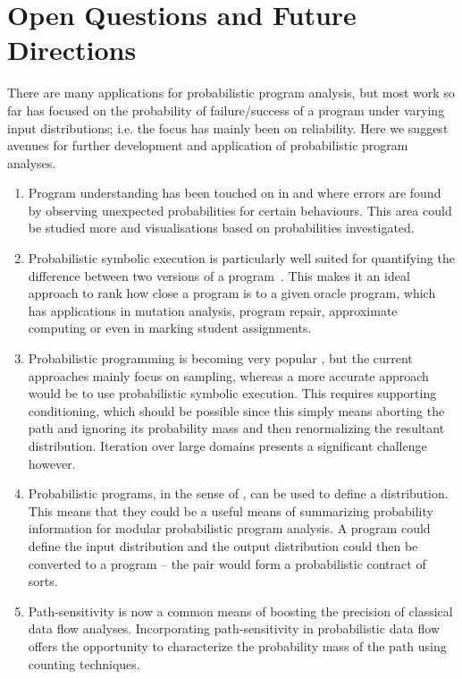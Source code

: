 \section{Open Questions and Future Directions}
\label{sec:future}

There are many applications for probabilistic program analysis, but most work so far has focused on the probability of failure/success of a program under varying input distributions; i.e. the focus has mainly been on reliability.
Here we suggest avenues for further development and application of
probabilistic program analyses.

\begin{enumerate}

\item Program understanding has been touched on in \cite{Geldenhuys2012} and \cite{Filieri2015} where errors are found by observing unexpected probabilities for certain behaviours. This area could be studied more and visualisations based on probabilities investigated.

\item Probabilistic symbolic execution is particularly well suited for quantifying the difference between two versions of a program~\cite{Filieri2015b}. This makes it an ideal approach to rank how close a program is to a given oracle program, which has applications in mutation analysis, program repair, approximate computing or even in marking student assignments.

\item Probabilistic programming is becoming very popular \cite{Gordon2014}, but the current approaches mainly focus on sampling, whereas a more accurate approach would be to use probabilistic symbolic execution.  This requires supporting conditioning, which should be possible since this simply means aborting the path and ignoring its probability mass and then renormalizing the resultant distribution.  Iteration over large domains presents a significant challenge however.

\item Probabilistic programs, in the sense of \cite{Gordon2014}, can be used
to define a distribution.  This means that they could be a useful means of
summarizing probability information for modular probabilistic program analysis.
A program could define the input distribution and the output distribution
could then be converted to a program -- the pair would form a probabilistic
contract of sorts.

\item Path-sensitivity is now a common means of boosting the precision
of classical data flow analyses.  Incorporating path-sensitivity in
probabilistic data flow offers the opportunity to characterize
the probability mass of the path using counting techniques.


\end{enumerate}
